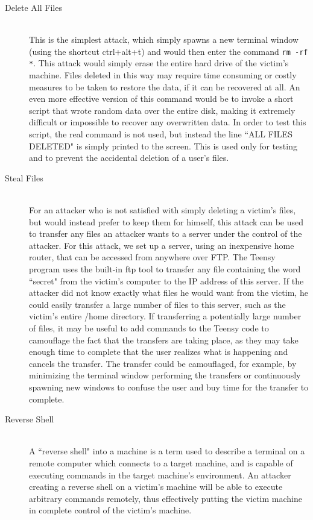 \documentclass[pagenumbers]{ieee}
\begin{document}
\begin{description}
\item[Delete All Files] \hfill \\
This is the simplest attack, which simply spawns a new terminal window (using the shortcut ctrl+alt+t) and would then enter the command \texttt{rm -rf *}. This attack would simply erase the entire hard drive of the victim's machine. Files deleted in this way may require time consuming or costly measures to be taken to restore the data, if it can be recovered at all. An even more effective version of this command would be to invoke a short script that wrote random data over the entire disk, making it extremely difficult or impossible to recover any overwritten data. In order to test this script, the real command is not used, but instead the line ``ALL FILES DELETED" is simply printed to the screen. This is used only for testing and to prevent the accidental deletion of a user's files. 

\item[Steal Files] \hfill \\
For an attacker who is not satisfied with simply deleting a victim's files, but would instead prefer to keep them for himself, this attack can be used to transfer any files an attacker wants to a server under the control of the attacker. For this attack, we set up a server, using an inexpensive home router, that can be accessed from anywhere over FTP. The Teensy program uses the built-in ftp tool to transfer any file containing the word ``secret" from the victim's computer to the IP address of this server.  If the attacker did not know exactly what files he would want from the victim, he could easily transfer a large number of files to this server, such as the victim's entire /home directory. If transferring a potentially large number of files, it may be useful to add commands to the Teensy code to camouflage the fact that the transfers are taking place, as they may take enough time to complete that the user realizes what is happening and cancels the transfer. The transfer could be camouflaged, for example, by minimizing the terminal window performing the transfers or continuously spawning new windows to confuse the user and buy time for the transfer to complete.

\item[Reverse Shell] \hfill \\
A ``reverse shell" into a machine is a term used to describe a terminal on a remote computer which connects to a target machine, and is capable of executing commands in the target machine's environment. An attacker creating a reverse shell on a victim's machine will be able to execute arbitrary commands remotely, thus effectively putting the victim machine in complete control of the victim's machine. 


\end{description}
\end{document}
